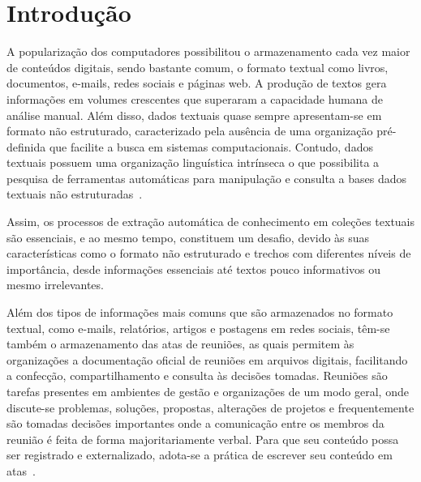 \chapter{Introdução}\label{cap1}

\let\cleardoublepage\clearpage


A popularização dos computadores possibilitou o armazenamento cada vez maior de conteúdos digitais, sendo bastante comum, o formato textual como livros, documentos, e-mails, redes sociais e páginas web. A produção de textos gera informações em volumes crescentes que superaram a capacidade humana de análise manual.  %
%
Além disso, dados textuais quase sempre apresentam-se em formato não estruturado, caracterizado pela ausência de uma organização pré-definida que facilite a busca em sistemas computacionais.
%
Contudo, dados textuais possuem uma organização linguística intrínseca o que possibilita a pesquisa de ferramentas automáticas para manipulação e consulta a bases dados textuais não estruturadas~\cite{Cao:2017, Manning2008}. 



Assim, os processos de extração automática de conhecimento em coleções textuais são essenciais, e ao mesmo tempo, constituem um desafio, devido às suas características como o formato não estruturado e trechos com diferentes níveis de importância, desde informações essenciais até textos pouco informativos ou mesmo irrelevantes. 

Além dos tipos de informações mais comuns que são armazenados no formato textual, como e-mails, relatórios, artigos e postagens em redes sociais, têm-se também o armazenamento das atas de reuniões, as quais permitem às organizações a documentação oficial de reuniões em arquivos digitais, facilitando a confecção, compartilhamento e consulta às decisões tomadas.
% 
% 
% 
Reuniões são tarefas presentes em ambientes de gestão e organizações de um modo geral, onde discute-se problemas, soluções, propostas, alterações de projetos e frequentemente são tomadas decisões importantes onde a comunicação entre os membros da reunião é feita de forma majoritariamente verbal. Para que seu conteúdo possa ser registrado e externalizado, adota-se a prática de escrever seu conteúdo em atas~\cite{Miriam2013, Lee2011}.

